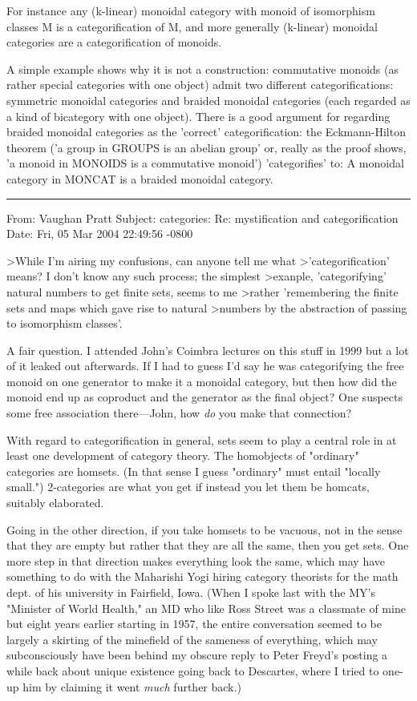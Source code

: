 For instance any (k-linear) monoidal category with monoid of isomorphism
classes M is a categorification of M, and more generally (k-linear) monoidal
categories are a categorification of monoids.

A simple example shows why it is not a construction:  commutative monoids
(as rather special categories with one object) admit two different
categorifications:  symmetric monoidal categories and braided monoidal
categories (each regarded as a kind of bicategory with one object).
There is a good argument for regarding braided monoidal categories
as the 'correct' categorification:  the Eckmann-Hilton theorem ('a group
in GROUPS is an abelian group'  or, really as the proof shows, 'a monoid
in MONOIDS is a commutative monoid') 'categorifies' to: A monoidal category
in MONCAT is a braided monoidal category.


\par\noindent\rule{\textwidth}{0.4pt}


From: 	 Vaughan Pratt 
Subject: categories: Re: mystification and categorification
Date: 	 Fri, 05 Mar 2004 22:49:56 -0800	

>While I'm airing my confusions, can anyone tell me what
>'categorification' means? I don't know any such process; the simplest
>exanple, 'categorifying' natural numbers to get finite sets, seems to me
>rather 'remembering the finite sets and maps which gave rise to natural
>numbers by the abstraction of passing to isomorphism classes'.

A fair question.  I attended John's Coimbra lectures on this stuff in 1999
but a lot of it leaked out afterwards.  If I had to guess I'd say he was
categorifying the free monoid on one generator to make it a monoidal category,
but then how did the monoid end up as coproduct and the generator as the
final object?  One suspects some free association there---John, how \emph{do}
you make that connection?

With regard to categorification in general, sets seem to play a central
role in at least one development of category theory.  The homobjects of
"ordinary" categories are homsets.  (In that sense I guess "ordinary" must
entail "locally small.")  2-categories are what you get if instead you let
them be homcats, suitably elaborated.

Going in the other direction, if you take homsets to be vacuous, not
in the sense that they are empty but rather that they are all the same,
then you get sets.  One more step in that direction makes everything look
the same, which may have something to do with the Maharishi Yogi hiring
category theorists for the math dept. of his university in Fairfield, Iowa.
(When I spoke last with the MY's "Minister of World Health," an MD who like
Ross Street was a classmate of mine but eight years earlier starting in 1957,
the entire conversation seemed to be largely a skirting of the minefield
of the sameness of everything, which may subconsciously have been behind my
obscure reply to Peter Freyd's posting a while back about unique existence
going back to Descartes, where I tried to one-up him by claiming it went
\emph{much} further back.)

